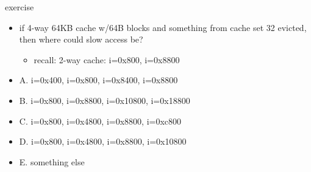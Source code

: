 \begin{frame}{exercise}
\begin{itemize}
\item if 4-way 64KB cache w/64B blocks and something from cache set 32 evicted,\\
then where could slow access be?
    \begin{itemize}
    \item recall: 2-way cache: i=0x800, i=0x8800
    \end{itemize}
\item A. i=0x400, i=0x800, i=0x8400, i=0x8800
\item B. i=0x800, i=0x8800, i=0x10800, i=0x18800
\item C. i=0x800, i=0x4800, i=0x8800, i=0xc800
\item D. i=0x800, i=0x4800, i=0x8800, i=0x10800
\item E. something else
\end{itemize}
\end{frame}

